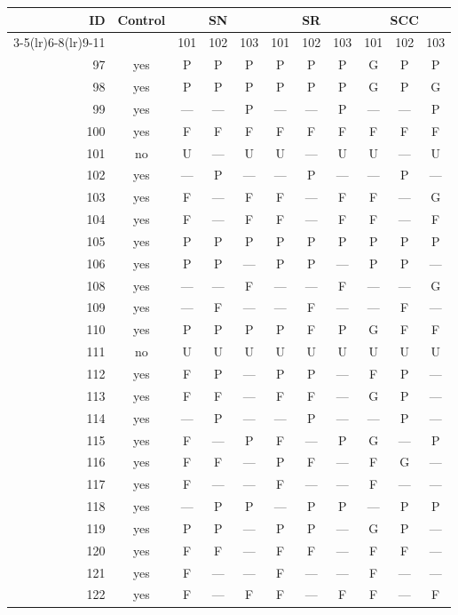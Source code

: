 \begin{table}[p]\centering\small
\begin{tabular*}{\textwidth}{@{\extracolsep{\fill}}rc*{9}{c}@{}}\toprule
ID & Control & \multicolumn{3}{c}{SN} & \multicolumn{3}{c}{SR} & \multicolumn{3}{c}{SCC}\\
\cmidrule(lr){3-5}\cmidrule(lr){6-8}\cmidrule(lr){9-11}
 & & 101 & 102 & 103 & 101 & 102 & 103 & 101 & 102 & 103\\\midrule
97 & yes & P & P & P & P & P & P & G & P & P\\
98 & yes & P & P & P & P & P & P & G & P & G\\
99 & yes & — & — & P & — & — & P & — & — & P\\
100 & yes & F & F & F & F & F & F & F & F & F\\
101 & no & U & — & U & U & — & U & U & — & U\\
102 & yes & — & P & — & — & P & — & — & P & —\\
103 & yes & F & — & F & F & — & F & F & — & G\\
104 & yes & F & — & F & F & — & F & F & — & F\\
105 & yes & P & P & P & P & P & P & P & P & P\\
106 & yes & P & P & — & P & P & — & P & P & —\\
108 & yes & — & — & F & — & — & F & — & — & G\\
109 & yes & — & F & — & — & F & — & — & F & —\\
110 & yes & P & P & P & P & F & P & G & F & F\\
111 & no & U & U & U & U & U & U & U & U & U\\
112 & yes & F & P & — & P & P & — & F & P & —\\
113 & yes & F & F & — & F & F & — & G & P & —\\
114 & yes & — & P & — & — & P & — & — & P & —\\
115 & yes & F & — & P & F & — & P & G & — & P\\
116 & yes & F & F & — & P & F & — & F & G & —\\
117 & yes & F & — & — & F & — & — & F & — & —\\
118 & yes & — & P & P & — & P & P & — & P & P\\
119 & yes & P & P & — & P & P & — & G & P & —\\
120 & yes & F & F & — & F & F & — & F & F & —\\
121 & yes & F & — & — & F & — & — & F & — & —\\
122 & yes & F & — & F & F & — & F & F & — & F\\

\end{tabular*}
\end{table}
